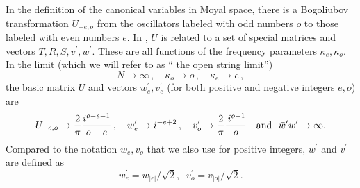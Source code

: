 \documentclass[a4paper,aps,preprint,nofootinbib,eqsecnum]{revtex4}
\begin{document}
In the definition of the canonical variables in Moyal space, there is a
Bogoliubov transformation $U_{-e,o}$ from the oscillators labeled with odd
numbers $o$ to those labeled with even numbers $e$. In \cite{BM1, BM2, BKM1}%
, $U$ is related to a set of special matrices and vectors $T,R,S,v^{\prime
},w^{\prime }$. These are all functions of the frequency parameters $\kappa
_{e},\kappa _{o}.$ In the limit (which we will refer to as \textquotedblleft
the open string limit\textquotedblright )
\begin{equation}
N\rightarrow \infty \,,\quad \kappa _{o}\rightarrow o\,,\quad \kappa
_{e}\rightarrow e\,,  \label{open_string_limit}
\end{equation}%
the basic matrix $U$ and vectors $w_{e}^{\prime },v_{e}^{\prime }$ (for both
positive and negative integers $e,o$) are
\begin{equation}
U_{-e,o}\rightarrow \frac{2}{\pi }\frac{i^{o-e-1}}{o-e}\,,\quad
w_{e}^{\prime }\rightarrow i^{-e+2}\,,\quad v_{o}^{\prime }\rightarrow \frac{%
2}{\pi }\frac{\,i^{o-1}}{o}\quad \mbox{and }\ \bar{w}^{\prime }w^{\prime
}\rightarrow \infty .  \label{limit}
\end{equation}%
Compared to the notation $w_{e},v_{o}$ that we also use for positive
integers, $w^{\prime }$ and $v^{\prime }$ are defined as
\begin{equation}
w_{e}^{\prime }=w_{|e|}/\sqrt{2},\;\;v_{o}^{\prime }=v_{|o|}/\sqrt{2}.
\end{equation}
\end{document}
